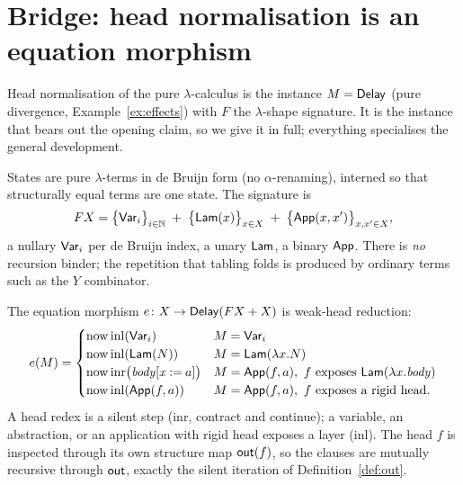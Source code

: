 \section{Bridge: head normalisation is an equation morphism}\label{sec:bridge}
Head normalisation of the pure $\lambda$-calculus is the instance $M = \mathsf{Delay}$ (pure divergence,
Example~\ref{ex:effects}) with $F$ the $\lambda$-shape signature. It is the instance that bears out the
opening claim, so we give it in full; everything specialises the general development.

\begin{definition}\label{def:lamsig}
  States are pure $\lambda$-terms in de Bruijn form (no $\alpha$-renaming), interned so that
  structurally equal terms are one state. The signature is
  \[
    F X = \big\{\mathsf{Var}_i\big\}_{i\in\mathbb{N}} \;+\; \big\{\mathsf{Lam}(x)\big\}_{x\in X} \;+\; \big\{\mathsf{App}(x,x')\big\}_{x,x'\in X},
  \]
  a nullary $\mathsf{Var}_i$ per de Bruijn index, a unary $\mathsf{Lam}$, a binary $\mathsf{App}$. There is \emph{no}
  recursion binder; the repetition that tabling folds is produced by ordinary terms such as the
  $Y$ combinator.
\end{definition}

\begin{definition}\label{def:shbridge}
  The equation morphism $e \colon X \to \mathsf{Delay}(F X + X)$ is weak-head reduction:
  \[
    e(M) =
    \begin{cases}
      \mathrm{now}\,\mathrm{inl}(\mathsf{Var}_i) & M = \mathsf{Var}_i\\
      \mathrm{now}\,\mathrm{inl}(\mathsf{Lam}(N)) & M = \mathsf{Lam}(\lambda x.N)\\
      \mathrm{now}\,\mathrm{inr}\big(\mathit{body}[x\mathbin{:=}a]\big) & M = \mathsf{App}(f,a),\ f \text{ exposes } \mathsf{Lam}(\lambda x.\mathit{body})\\
      \mathrm{now}\,\mathrm{inl}(\mathsf{App}(f,a)) & M = \mathsf{App}(f,a),\ f \text{ exposes a rigid head.}
    \end{cases}
  \]
  A head redex is a silent step ($\mathrm{inr}$, contract and continue); a variable, an abstraction,
  or an application with rigid head exposes a layer ($\mathrm{inl}$). The head $f$ is inspected through
  its own structure map $\mathsf{out}(f)$, so the clauses are mutually recursive through $\mathsf{out}$, exactly the
  silent iteration of Definition~\ref{def:out}.
\end{definition}

